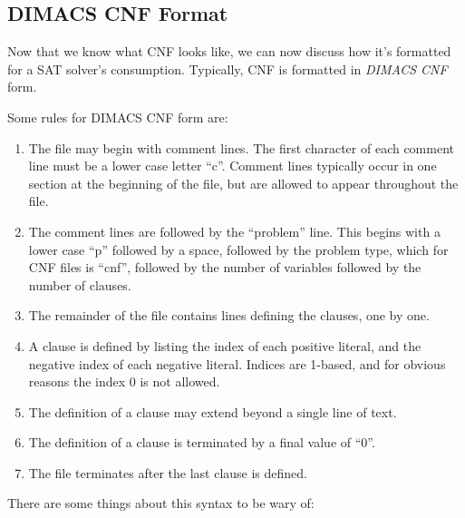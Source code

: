 \subsection*{DIMACS CNF Format}

Now that we know what CNF looks like, we can now discuss how it's formatted
for a SAT solver's consumption. Typically, CNF is formatted in
\emph{DIMACS CNF} form.

Some rules for DIMACS CNF form are:

\begin{enumerate}
    \item The file may begin with comment lines. The first character of each
    comment line must be a lower case letter ``c''. Comment lines typically
    occur in one section at the beginning of the file, but are allowed to appear
    throughout the file.

    \item The comment lines are followed by the ``problem'' line. This begins
    with a lower case ``p'' followed by a space, followed by the problem type,
    which for CNF files is ``cnf'', followed by the number of variables followed
    by the number of clauses.

    \item The remainder of the file contains lines defining the clauses, one by
    one.

    \item A clause is defined by listing the index of each positive literal, and
    the negative index of each negative literal. Indices are 1-based, and for
    obvious reasons the index 0 is not allowed.

    \item The definition of a clause may extend beyond a single line of text.

    \item The definition of a clause is terminated by a final value of
    ``0''.

    \item The file terminates after the last clause is defined.
\end{enumerate}

There are some things about this syntax to be wary of:

